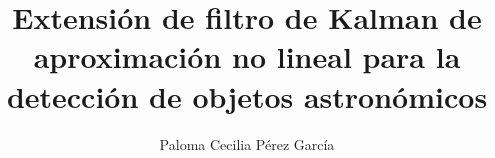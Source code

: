 \documentclass[letterpaper]{templates/uchile-tesis}
\title{Extensi\'on de filtro de Kalman de aproximaci\'on no lineal para la detecci\'on de objetos astronómicos}
\author{Paloma Cecilia Pérez Garc\'ia}
\begin{document}
\newpage

\maketitle




\tableofcontents

\listoftables

\listoffigures
 


%




%

\printglossaries




\end{document}
